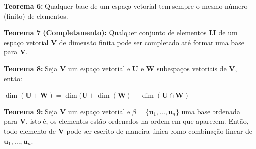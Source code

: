 \noindent\textbf{Teorema 6:} Qualquer base de um espaço vetorial tem sempre o mesmo número (finito) de elementos.

\noindent\textbf{Teorema 7 (Completamento):} Qualquer conjunto de elementos \textbf{LI} de um espaço vetorial $\mathbf{V}$ de dimensão finita pode ser completado até formar uma base para $\mathbf{V}$.

\noindent\textbf{Teorema 8:} Seja $\mathbf{V}$ um espaço vetorial e $\mathbf{U}$ e $\mathbf{W}$ subespaços vetoriais de $\mathbf{V}$, então:

\centerline{$\dim(\mathbf{U} + \mathbf{W}) = \dim(\mathbf{U} + \dim(\mathbf{W}) - \dim(\mathbf{U} \cap \mathbf{W})$}

\noindent\textbf{Teorema 9:} Seja $\mathbf{V}$ um espaço vetorial e $\beta = \{\mathbf{u}_1, \ldots,\mathbf{u}_n\}$ uma base ordenada para $\mathbf{V}$, isto é, os elementos estão ordenados na ordem em que aparecem. Então, todo elemento de $\mathbf{V}$ pode ser escrito de maneira única como combinação linear de $\mathbf{u}_1, \ldots, \mathbf{u}_n$.

